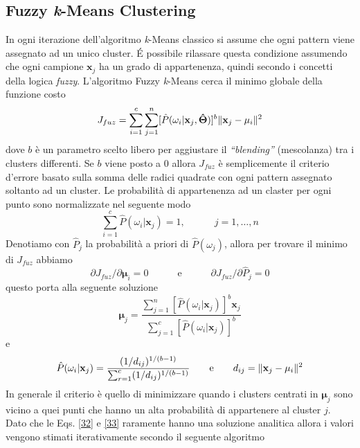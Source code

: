 \subsection{Fuzzy \emph{k}-Means Clustering}
In ogni iterazione dell'algoritmo \emph{k}-Means classico si assume che ogni pattern viene assegnato ad un unico cluster. \'E possibile rilassare questa condizione assumendo che ogni campione $\mathbf{x}_j$ ha un grado di appartenenza, quindi secondo i concetti della logica \emph{fuzzy}. L'algoritmo Fuzzy \emph{k}-Means cerca il minimo globale della funzione costo
\begin{equation}
J_{fuz} = \sum_{i=1}^c \sum_{j=1}^n [ \hat{P} (\omega_i | \mathbf{x}_j,  \mathbf{\hat{\Theta}}) ]^b \lVert\mathbf{x}_j - \mathbf{\mu}_i\rVert^2
\end{equation}
dove  $b$ è un parametro scelto libero per aggiustare il \emph{``blending''} (mescolanza) tra i clusters differenti. Se $b$ viene posto a 0 allora $J_{fuz}$ è semplicemente il criterio d'errore basato sulla somma delle radici quadrate con ogni pattern assegnato soltanto ad un cluster. Le probabilità di appartenenza ad un claster per ogni punto sono normalizzate nel seguente modo
\begin{equation}\label{30}
\sum_{i=1}^c \hat{P}(\omega_i | \mathbf{x}_j) = 1, \quad \quad \quad j=1, \dots, n
\end{equation}
Denotiamo con $\hat{P}_j$ la probabilità a priori di $\hat{P}(\omega_j)$, allora per trovare il minimo di $J_{fuz}$ abbiamo
\begin{equation}\label{31}
\partial J_{fuz} / \partial \mathbf{\mu}_i = 0 \quad \quad \quad \text{e} \quad \quad \quad \partial J_{fuz} / \partial \hat{P}_j = 0
\end{equation}
questo porta alla seguente soluzione
\begin{equation}\label{32}
\mathbf{\mu}_j = \frac{\sum_{j=1}^n [ \hat{P}(\omega_i | \mathbf{x}_j)]^b \mathbf{x}_j}{\sum_{j=1}^c [ \hat{P}(\omega_i | \mathbf{x}_j)]^b}
\end{equation}
e
\begin{equation}\label{33}
\hat{P}(\omega_i | \mathbf{x}_j) = \frac{(1/d_{ij})^{1/(b-1)}}{\sum_{r=1}^c (1/d_{ij})^{1/(b-1)}} \quad \quad \text{e} \quad \quad d_{ij} = \lVert\mathbf{x}_j - \mathbf{\mu}_i\rVert^2
\end{equation}
In generale il criterio è quello di minimizzare quando i clusters centrati in $\mathbf{\mu}_j$ sono vicino a quei punti che hanno un alta probabilità di appartenere al cluster $j$. Dato che le Eqs. \ref{32} e \ref{33} raramente hanno una soluzione analitica allora i valori vengono stimati iterativamente secondo il seguente algoritmo 
